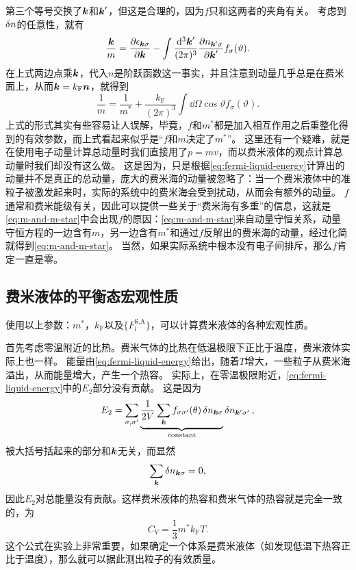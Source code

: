 第三个等号交换了$\vb*{k}$和$\vb*{k}'$，但这是合理的，因为$f$只和这两者的夹角有关。
考虑到$\var{n}$的任意性，就有
\[
    \frac{\vb*{k}}{m} = \pdv{\epsilon_{\vb*{k} \sigma}}{\vb*{k}} - \int \frac{\dd[3]{\vb*{k}'}}{(2\pi)^3} \pdv{n_{\vb*{k}' \sigma}}{\vb*{k}'} f_{\sigma}(\vartheta).
\]
在上式两边点乘$\vb*{k}$，代入$n$是阶跃函数这一事实，并且注意到动量几乎总是在费米面上，从而$\vb*{k} = k_\text{F} \vb*{n}$，就得到
\begin{equation}
    \frac{1}{m} = \frac{1}{m^*} + \frac{k_\text{F}}{(2\pi)^3} \int \dd{\Omega} \cos \vartheta f_\sigma(\vartheta).
    \label{eq:m-and-m-star}
\end{equation}
上式的形式其实有些容易让人误解，毕竟，$f$和$m^*$都是加入相互作用之后重整化得到的有效参数，而上式看起来似乎是“$f$和$m$决定了$m^*$”。
这里还有一个疑难，就是在使用电子动量计算总动量时我们直接用了$p=mv$，而以费米液体的观点计算总动量时我们却没有这么做。
这是因为，只是根据\eqref{eq:fermi-liquid-energy}计算出的动量并不是真正的总动量，庞大的费米海的动量被忽略了：当一个费米液体中的准粒子被激发起来时，实际的系统中的费米海会受到扰动，从而会有额外的动量。
$f$通常和费米能级有关，因此可以提供一些关于“费米海有多重”的信息，这就是\eqref{eq:m-and-m-star}中会出现$f$的原因：\eqref{eq:m-and-m-star}来自动量守恒关系，动量守恒方程的一边含有$m$，另一边含有$m^*$和通过$f$反解出的费米海的动量，经过化简就得到\eqref{eq:m-and-m-star}。
当然，如果实际系统中根本没有电子间排斥，那么$f$肯定一直是零。

\subsection{费米液体的平衡态宏观性质}

使用以上参数：$m^*$，$k_\text{F}$以及$\{F_l^\text{S,A}\}$，可以计算费米液体的各种宏观性质。

首先考虑零温附近的比热。费米气体的比热在低温极限下正比于温度，费米液体实际上也一样。
能量由\eqref{eq:fermi-liquid-energy}给出，随着$T$增大，一些粒子从费米海溢出，从而能量增大，产生一个热容。
实际上，在零温极限附近，\eqref{eq:fermi-liquid-energy}中的$E_2$部分没有贡献。
这是因为
\[
    E_2 = \sum_{\sigma, \sigma'} \underbrace{\frac{1}{2V} \sum_{\vb*{k}} f_{\sigma \sigma'}(\theta) \var{n}_{\vb*{k} \sigma}}_{\text{constant}} \var{n}_{\vb*{k}' \sigma'},
\]
被大括号括起来的部分和$\vb*{k}$无关，而显然
\[
    \sum_{\vb*{k}} \var{n}_{\vb*{k} \sigma} = 0,
\]
因此$E_2$对总能量没有贡献。这样费米液体的热容和费米气体的热容就是完全一致的，为
\begin{equation}
    C_V = \frac{1}{3} m^* k_\text{F} T.
\end{equation}
这个公式在实验上非常重要，如果确定一个体系是费米液体（如发现低温下热容正比于温度），那么就可以据此测出粒子的有效质量。


